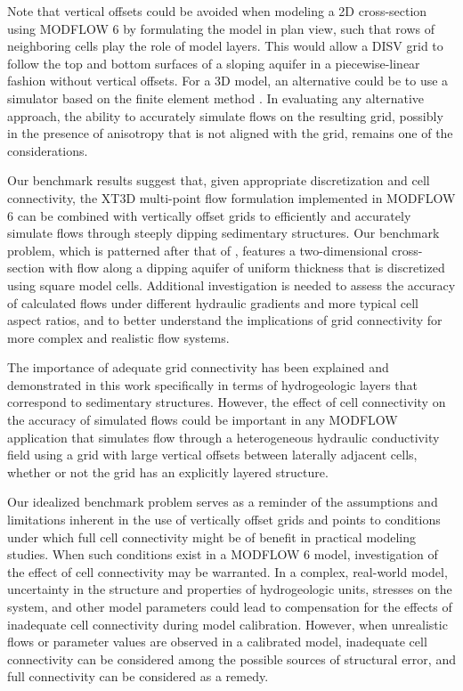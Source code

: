 \documentclass{article}
\begin{document}
Note that vertical offsets could be avoided when modeling a 2D cross-section using MODFLOW 6 by formulating the model in plan view, such that rows of neighboring cells play the role of model layers. This would allow a DISV grid to follow the top and bottom surfaces of a sloping aquifer in a piecewise-linear fashion without vertical offsets. For a 3D model, an alternative could be to use a simulator based on the finite element method \citep[see, e.g.,][]{yager2009anisotropy}. In evaluating any alternative approach, the ability to accurately simulate flows on the resulting grid, possibly in the presence of anisotropy that is not aligned with the grid, remains one of the considerations.

Our benchmark results suggest that, given appropriate discretization and cell connectivity, the XT3D multi-point flow formulation implemented in MODFLOW 6 can be combined with vertically offset grids to efficiently and accurately simulate flows through steeply dipping sedimentary structures. Our benchmark problem, which is patterned after that of \cite{bardot2023}, features a two-dimensional cross-section with flow along a dipping aquifer of uniform thickness that is discretized using square model cells. Additional investigation is needed to assess the accuracy of calculated flows under different hydraulic gradients and more typical cell aspect ratios, and to better understand the implications of grid connectivity for more complex and realistic flow systems.

The importance of adequate grid connectivity has been explained and demonstrated in this work specifically in terms of hydrogeologic layers that correspond to sedimentary structures. However, the effect of cell connectivity on the accuracy of simulated flows could be important in any MODFLOW application that simulates flow through a heterogeneous hydraulic conductivity field using a grid with large vertical offsets between laterally adjacent cells, whether or not the grid has an explicitly layered structure. 

Our idealized benchmark problem serves as a reminder of the assumptions and limitations inherent in the use of vertically offset grids and points to conditions under which full cell connectivity might be of benefit in practical modeling studies. When such conditions exist in a MODFLOW 6 model, investigation of the effect of cell connectivity may be warranted. In a complex, real-world model, uncertainty in the structure and properties of hydrogeologic units, stresses on the system, and other model parameters could lead to compensation for the effects of inadequate cell connectivity during model calibration. However, when unrealistic flows or parameter values are observed in a calibrated model, inadequate cell connectivity can be considered among the possible sources of structural error, and full connectivity can be considered as a remedy.
\end{document}
